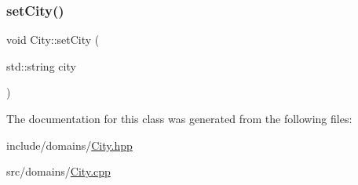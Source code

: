 \mbox{\label{class_city_a9f2a2f59076c2ec2591d3713e8ee29c5}} 
\subsubsection{\texorpdfstring{setCity()}{setCity()}}
{\footnotesize\ttfamily void City\+::set\+City (\begin{DoxyParamCaption}\item[{std\+::string}]{city }\end{DoxyParamCaption})}



The documentation for this class was generated from the following files\+:\begin{DoxyCompactItemize}
\item 
include/domains/\mbox{\hyperlink{_city_8hpp}{City.\+hpp}}\item 
src/domains/\mbox{\hyperlink{_city_8cpp}{City.\+cpp}}\end{DoxyCompactItemize}
